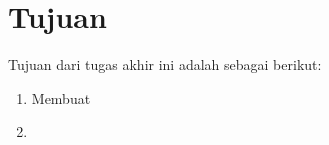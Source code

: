 \section{Tujuan}
\label{sec:Tujuan}

Tujuan dari tugas akhir ini adalah sebagai berikut:

\begin{enumerate}[nolistsep]

  \item Membuat \textcolor{red}{\lipsum[2][1-3]}

  \item \textcolor{red}{\lipsum[3][1-3]}

\end{enumerate}
